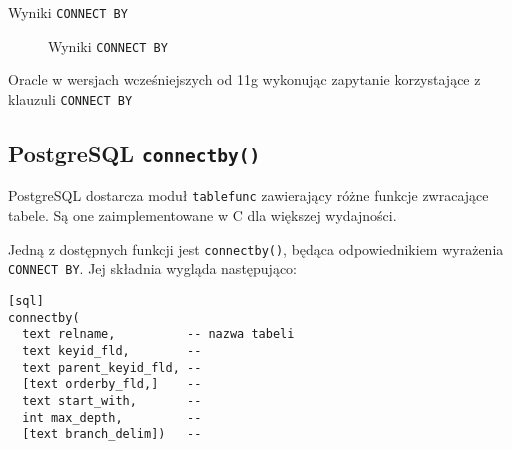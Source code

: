 


\begin{table}[h!]
  \caption{Wyniki \texttt{CONNECT BY}}
  \begin{center}
  \end{center}
\end{table}

\begin{figure}[h!t]
  \caption{Wyniki \texttt{CONNECT BY}}
  \label{fig:img_chart_simple}
  \begin{center}
  \end{center}
\end{figure}



Oracle w wersjach wcześniejszych od 11g wykonując zapytanie korzystające z klauzuli \texttt{CONNECT BY}




\subsection*{PostgreSQL \texttt{connectby()}}

PostgreSQL dostarcza moduł \texttt{tablefunc} zawierający różne funkcje zwracające tabele.
Są one zaimplementowane w C dla większej wydajności.

Jedną z dostępnych funkcji jest \texttt{connectby()}, będąca odpowiednikiem wyrażenia \texttt{CONNECT BY}. Jej składnia wygląda następująco:

\begin{verbatim}[sql]
connectby(
  text relname,          -- nazwa tabeli
  text keyid_fld,        -- 
  text parent_keyid_fld, -- 
  [text orderby_fld,]    -- 
  text start_with,       -- 
  int max_depth,         -- 
  [text branch_delim])   -- 
\end{verbatim}





